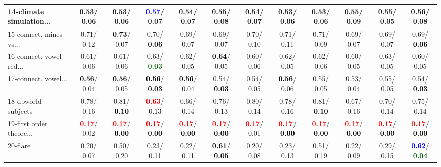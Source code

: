 \begin{table}[h]
\begin{center}
{\begin{tabular}{lc|c|c|c|c|c|c|c|c|c|c}
14-climate simulation... &   0.53/  0.06 &   0.53/  0.06 & \underline{\textcolor{blue}{\textbf{  0.57}}}/  0.07 &   0.54/  0.07 &   0.55/  0.08 &   0.54/  0.07 &   0.53/  0.06 &   0.53/  0.06 &   0.55/  0.09 &   0.55/  0.05 & \textcolor{black}{\textbf{  0.56}}/  0.08 \\ \hline
15-connect. mines vs... &   0.71/  0.12 & \textcolor{black}{\textbf{  0.73}}/  0.07 &   0.70/\textcolor{black}{\textbf{  0.06}} &   0.69/  0.07 &   0.69/  0.07 &   0.70/  0.10 &   0.71/  0.11 &   0.71/  0.09 &   0.69/  0.07 &   0.69/  0.07 &   0.69/\textcolor{black}{\textbf{  0.06}} \\
16-connect. vowel red... &   0.61/  0.06 &   0.61/  0.06 &   0.63/\textcolor{darkgreen}{\textbf{  0.03}} &   0.62/  0.05 & \textcolor{black}{\textbf{  0.64}}/  0.05 &   0.60/  0.06 &   0.62/  0.05 &   0.62/  0.06 &   0.60/  0.05 &   0.63/  0.05 &   0.60/  0.05 \\
17-connect. vowel... & \textcolor{black}{\textbf{  0.56}}/  0.04 & \textcolor{black}{\textbf{  0.56}}/  0.05 & \textcolor{black}{\textbf{  0.56}}/\textcolor{black}{\textbf{  0.03}} & \textcolor{black}{\textbf{  0.56}}/  0.04 &   0.54/\textcolor{black}{\textbf{  0.03}} &   0.54/  0.05 & \textcolor{black}{\textbf{  0.56}}/  0.06 &   0.55/  0.05 &   0.53/  0.04 &   0.55/  0.05 &   0.54/\textcolor{black}{\textbf{  0.03}} \\
18-dbworld subjects &   0.78/  0.16 &   0.81/\textcolor{black}{\textbf{  0.10}} & \textcolor{red}{\textbf{  0.63}}/  0.13 &   0.66/  0.14 &   0.76/  0.13 &   0.80/  0.14 &   0.78/  0.16 &   0.81/\textcolor{black}{\textbf{  0.10}} &   0.67/  0.16 &   0.70/  0.14 &   0.75/  0.14 \\
19-first order theore... & \textcolor{red}{\textbf{  0.17}}/  0.02 & \textcolor{red}{\textbf{  0.17}}/\textcolor{black}{\textbf{  0.00}} & \textcolor{red}{\textbf{  0.17}}/\textcolor{black}{\textbf{  0.00}} & \textcolor{red}{\textbf{  0.17}}/\textcolor{black}{\textbf{  0.00}} & \textcolor{red}{\textbf{  0.17}}/\textcolor{black}{\textbf{  0.00}} & \textcolor{red}{\textbf{  0.17}}/  0.01 & \textcolor{red}{\textbf{  0.17}}/\textcolor{black}{\textbf{  0.00}} & \textcolor{red}{\textbf{  0.17}}/\textcolor{black}{\textbf{  0.00}} & \textcolor{red}{\textbf{  0.17}}/\textcolor{black}{\textbf{  0.00}} & \textcolor{red}{\textbf{  0.17}}/\textcolor{black}{\textbf{  0.00}} & \textcolor{red}{\textbf{  0.17}}/\textcolor{black}{\textbf{  0.00}} \\
20-flare &   0.20/  0.07 &   0.50/  0.20 &   0.23/  0.11 &   0.22/  0.11 & \textcolor{black}{\textbf{  0.61}}/\textcolor{black}{\textbf{  0.05}} &   0.20/  0.08 &   0.23/  0.13 &   0.51/  0.19 &   0.22/  0.09 &   0.29/  0.15 & \underline{\textcolor{blue}{\textbf{  0.62}}}/\textcolor{darkgreen}{\textbf{  0.04}} \\

\end{tabular}}
\end{center}
\end{table}

